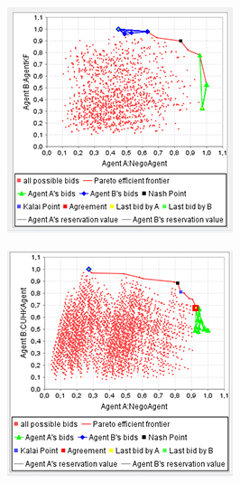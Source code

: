 \documentclass[html]{report}    %
\begin{document}
\begin{figure}
\begin{minipage}{.3\textwidth}
  \label{fig:4}
\end{minipage}
\begin{minipage}{.3\textwidth}
  \centering
  \includegraphics[width=.9\linewidth]{5}
  \label{fig:5}
\end{minipage}
\begin{minipage}{.3\textwidth}
  \centering
  \includegraphics[width=.9\linewidth]{6}

\end{minipage}
\end{figure}
\end{document}
